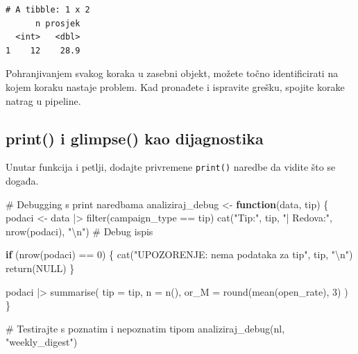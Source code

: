 \documentclass[
  croatian,
  letterpaper,
  DIV=11,
  numbers=noendperiod]{scrartcl}
\newenvironment{Shaded}{\begin{snugshade}}{\end{snugshade}}
\newcommand{\AttributeTok}[1]{\textcolor[rgb]{0.40,0.45,0.13}{#1}}
\newcommand{\CommentTok}[1]{\textcolor[rgb]{0.37,0.37,0.37}{#1}}
\newcommand{\ConstantTok}[1]{\textcolor[rgb]{0.56,0.35,0.01}{#1}}
\newcommand{\ControlFlowTok}[1]{\textcolor[rgb]{0.00,0.23,0.31}{\textbf{#1}}}
\newcommand{\DecValTok}[1]{\textcolor[rgb]{0.68,0.00,0.00}{#1}}
\newcommand{\FunctionTok}[1]{\textcolor[rgb]{0.28,0.35,0.67}{#1}}
\newcommand{\NormalTok}[1]{\textcolor[rgb]{0.00,0.23,0.31}{#1}}
\newcommand{\OtherTok}[1]{\textcolor[rgb]{0.00,0.23,0.31}{#1}}
\newcommand{\SpecialCharTok}[1]{\textcolor[rgb]{0.37,0.37,0.37}{#1}}
\newcommand{\StringTok}[1]{\textcolor[rgb]{0.13,0.47,0.30}{#1}}
\begin{document}
\begin{verbatim}
# A tibble: 1 x 2
      n prosjek
  <int>   <dbl>
1    12    28.9
\end{verbatim}

Pohranjivanjem svakog koraka u zasebni objekt, možete točno
identificirati na kojem koraku nastaje problem. Kad pronađete i
ispravite grešku, spojite korake natrag u pipeline.

\subsection{print() i glimpse() kao
dijagnostika}\label{print-i-glimpse-kao-dijagnostika}

Unutar funkcija i petlji, dodajte privremene \texttt{print()} naredbe da
vidite što se događa.

\begin{Shaded}
\begin{Highlighting}[]
\CommentTok{\# Debugging s print naredbama}
\NormalTok{analiziraj\_debug }\OtherTok{\textless{}{-}} \ControlFlowTok{function}\NormalTok{(data, tip) \{}
\NormalTok{  podaci }\OtherTok{\textless{}{-}}\NormalTok{ data }\SpecialCharTok{|\textgreater{}} \FunctionTok{filter}\NormalTok{(campaign\_type }\SpecialCharTok{==}\NormalTok{ tip)}
  \FunctionTok{cat}\NormalTok{(}\StringTok{"Tip:"}\NormalTok{, tip, }\StringTok{"| Redova:"}\NormalTok{, }\FunctionTok{nrow}\NormalTok{(podaci), }\StringTok{"}\SpecialCharTok{\textbackslash{}n}\StringTok{"}\NormalTok{)  }\CommentTok{\# Debug ispis}
  
  \ControlFlowTok{if}\NormalTok{ (}\FunctionTok{nrow}\NormalTok{(podaci) }\SpecialCharTok{==} \DecValTok{0}\NormalTok{) \{}
    \FunctionTok{cat}\NormalTok{(}\StringTok{"UPOZORENJE: nema podataka za tip"}\NormalTok{, tip, }\StringTok{"}\SpecialCharTok{\textbackslash{}n}\StringTok{"}\NormalTok{)}
    \FunctionTok{return}\NormalTok{(}\ConstantTok{NULL}\NormalTok{)}
\NormalTok{  \}}
  
\NormalTok{  podaci }\SpecialCharTok{|\textgreater{}}
    \FunctionTok{summarise}\NormalTok{(}
      \AttributeTok{tip =}\NormalTok{ tip,}
      \AttributeTok{n =} \FunctionTok{n}\NormalTok{(),}
      \AttributeTok{or\_M =} \FunctionTok{round}\NormalTok{(}\FunctionTok{mean}\NormalTok{(open\_rate), }\DecValTok{3}\NormalTok{)}
\NormalTok{    )}
\NormalTok{\}}

\CommentTok{\# Testirajte s poznatim i nepoznatim tipom}
\FunctionTok{analiziraj\_debug}\NormalTok{(nl, }\StringTok{"weekly\_digest"}\NormalTok{)}
\end{Highlighting}
\end{Shaded}
\end{document}
